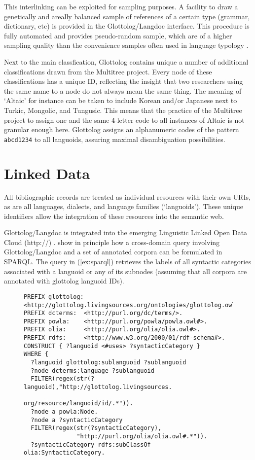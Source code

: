 \documentclass[10pt, a4paper]{article}
\begin{document}
This interlinking can be exploited for sampling purposes. A facility to draw a genetically and areally balanced sample of references of a certain type (grammar, dictionary, etc) is provided in the Glottolog/Langdoc interface. This procedure is fully automated and provides pseudo-random sample, which are of a higher sampling quality than the convenience samples often used in language typology \cite{NordhoffEtAl2011alt}.


Next to the main classfication, Glottolog contains unique a number of additional classifications drawn from the Multitree project. Every node of these classifications has a unique ID, reflecting the insight that two researchers using the same name to a node do not always mean the same thing. The meaning of `Altaic' for instance can be taken to include Korean and/or Japanese next to Turkic, Mongolic, and Tungusic. This means that the practice of the Multitree project to assign one and the same 4-letter code to all instances of Altaic is not granular enough here. Glottolog assigns an alphanumeric codes of the pattern \texttt{abcd1234} to all languoids, assuring maximal disambiguation possibilities.

\section{Linked Data}

All bibliographic records are treated as individual resources with their own
URIs, as are all languages, dialects, and language families (`languoids'). These
unique identifiers allow the integration of these resources into the semantic web\cite{NordhoffEtAl2011iswc}.

Glottolog/Langdoc is integrated into the emerging Linguistic Linked Open Data Cloud (http://) \cite{ChiarcosEtAl2012tal,Nordhoff2012ldl}. \cite{ChiarcosEtAl2012llod} show in principle how a cross-domain query involving Glottolog/Langdoc and a set of annotated corpora can be formulated in SPARQL. The query in (\ref{ex:sparql}) retrieves the labels of all syntactic categories associated with a languoid or any of its subnodes (assuming that all corpora are annotated with glottolog languoid IDs).

 
\begin{figure}
\tiny
\begin{verbatim}
PREFIX glottolog: <http://glottolog.livingsources.org/ontologies/glottolog.owl#>.
PREFIX dcterms:  <http://purl.org/dc/terms/>.
PREFIX powla:    <http://purl.org/powla/powla.owl#>.
PREFIX olia:     <http://purl.org/olia/olia.owl#>.
PREFIX rdfs:     <http://www.w3.org/2000/01/rdf-schema#>.
CONSTRUCT { ?languoid <#uses> ?syntacticCategory }
WHERE {
  ?languoid glottolog:sublanguoid ?sublanguoid
  ?node dcterms:language ?sublanguoid
  FILTER(regex(str(?languoid),"http://glottolog.livingsources.
                                 org/resource/languoid/id/.*")).
  ?node a powla:Node.
  ?node a ?syntacticCategory
  FILTER(regex(str(?syntacticCategory),
               "http://purl.org/olia/olia.owl#.*")).
  ?syntacticCategory rdfs:subClassOf olia:SyntacticCategory. 
\end{verbatim}
\end{figure}
\end{document}

